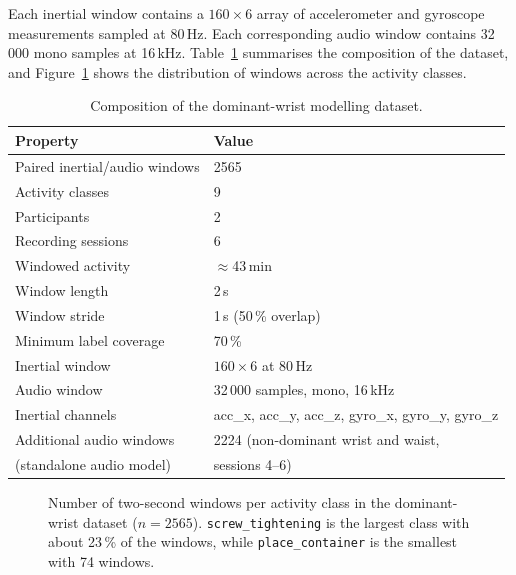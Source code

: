 Each inertial window contains a $160 \times 6$ array of accelerometer and
gyroscope measurements sampled at 80\,Hz. Each corresponding audio window
contains 32\,000 mono samples at 16\,kHz. Table~\ref{tab:composition}
summarises the composition of the dataset, and Figure~\ref{fig:classdist}
shows the distribution of windows across the activity classes.

\begin{table}[htbp]
\centering
\begin{tabular}{|l|l|}
\hline
\textbf{Property} & \textbf{Value} \\
\hline
Paired inertial/audio windows & 2565 \\
Activity classes              & 9 \\
Participants                  & 2 \\
Recording sessions            & 6 \\
Windowed activity             & $\approx$43\,min \\
Window length                 & 2\,s \\
Window stride                 & 1\,s (50\,\% overlap) \\
Minimum label coverage        & 70\,\% \\
Inertial window               & $160 \times 6$ at 80\,Hz \\
Audio window                  & 32\,000 samples, mono, 16\,kHz \\
Inertial channels             & acc\_x, acc\_y, acc\_z, gyro\_x, gyro\_y, gyro\_z \\
Additional audio windows      & 2224 (non-dominant wrist and waist, \\
\quad (standalone audio model) & sessions 4--6) \\
\hline
\end{tabular}
\caption{Composition of the dominant-wrist modelling dataset.}
\label{tab:composition}
\end{table}

\begin{figure}[htbp]
\centering
{}
\caption{Number of two-second windows per activity class in the dominant-wrist
dataset ($n = 2565$). \texttt{screw\_tightening} is the largest class with about
23\,\% of the windows, while \texttt{place\_container} is the smallest with 74
windows.}
\label{fig:classdist}
\end{figure}

